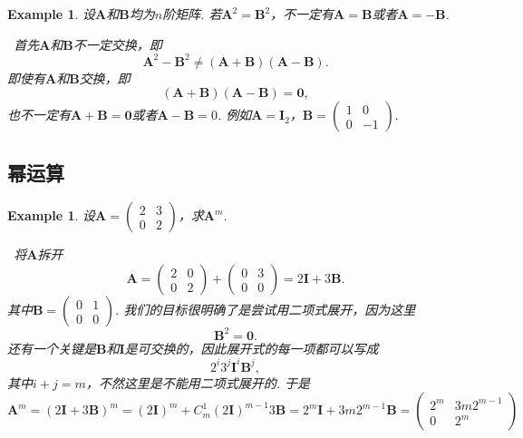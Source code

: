 \documentclass{article}
\newtheorem{example}[theorem]{Example}
\newcommand{\hints}{{\color{blue} \text{hints}}}
\newcommand{\mbf}[1]{\bm{#1}}
\begin{document}
\begin{example}
\rm 设$\mbf{A}$和$\mbf{B}$均为$n$阶矩阵. 若$\mbf{A}^2 = \mbf{B}^2$，不一定有$\mbf{A} = \mbf{B}$或者$\mbf{A} = -\mbf{B}$.

\hints\ 首先$\mbf{A}$和$\mbf{B}$不一定交换，即
$$
\mbf{A}^2 - \mbf{B}^2 \neq (\mbf{A} + \mbf{B})(\mbf{A} - \mbf{B}).
$$
即使有$\mbf{A}$和$\mbf{B}$交换，即
$$
(\mbf{A} + \mbf{B})(\mbf{A} - \mbf{B}) = \mbf{0},
$$
也不一定有$\mbf{A} + \mbf{B} = \mbf{0}$或者$\mbf{A} - \mbf{B} = 0$. 例如$\mbf{A} = \mbf{I}_2$，$\mbf{B} = \begin{pmatrix}
1 & 0 \\
0 & -1
\end{pmatrix}.$
\end{example}

\subsection{幂运算}


\begin{example}
\rm 设$\mbf{A} = \begin{pmatrix}
2 & 3 \\
0 & 2
\end{pmatrix}$，求$\mbf{A}^m$. 

\hints\ 将$\mbf{A}$拆开
$$
\mbf{A} = \begin{pmatrix}
2 & 0 \\
0 & 2 
\end{pmatrix} + \begin{pmatrix}
0 & 3 \\
0 & 0
\end{pmatrix} = 2\mbf{I} + 3\mbf{B}.
$$
其中$\mbf{B}= \begin{pmatrix}
0 & 1 \\
0 & 0
\end{pmatrix}$. 我们的目标很明确了是尝试用二项式展开，因为这里
$$
\mbf{B}^2 = \mbf{0}. 
$$
还有一个关键是$\mbf{B}$和$\mbf{I}$是可交换的，因此展开式的每一项都可以写成
$$
2^i3^j \mbf{I}^i \mbf{B}^j,
$$ 
其中$i+j=m$，不然这里是不能用二项式展开的. 于是
$$
\mbf{A}^m = (2\mbf{I} + 3\mbf{B})^m = (2\mbf{I})^m + C_m^1 (2\mbf{I})^{m-1}3\mbf{B} = 2^m \mbf{I} + 3m 2^{m-1}\mbf{B} = \begin{pmatrix}
2^m & 3m2^{m-1} \\
0 & 2^m 
\end{pmatrix}
$$
\end{example}
\end{document}
